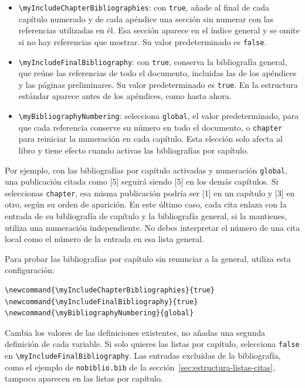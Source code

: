 \begin{itemize}
  \item \texttt{\textbackslash{}myIncludeChapterBibliographies}: con \texttt{true}, añade al final de cada capítulo numerado y de cada apéndice una sección sin numerar con las referencias utilizadas en él. Esa sección aparece en el índice general y se omite si no hay referencias que mostrar. Su valor predeterminado es \texttt{false}.
  \item \texttt{\textbackslash{}myIncludeFinalBibliography}: con \texttt{true}, conserva la bibliografía general, que reúne las referencias de todo el documento, incluidas las de los apéndices y las páginas preliminares. Su valor predeterminado es \texttt{true}. En la estructura estándar aparece antes de los apéndices, como hasta ahora.
  \item \texttt{\textbackslash{}myBibliographyNumbering}: selecciona \texttt{global}, el valor predeterminado, para que cada referencia conserve su número en todo el documento, o \texttt{chapter} para reiniciar la numeración en cada capítulo. Esta elección solo afecta al libro y tiene efecto cuando activas las bibliografías por capítulo.
\end{itemize}

Por ejemplo, con las bibliografías por capítulo activadas y numeración \texttt{global}, una publicación citada como [5] seguirá siendo [5] en los demás capítulos. Si seleccionas \texttt{chapter}, esa misma publicación podría ser [1] en un capítulo y [3] en otro, según su orden de aparición. En este último caso, cada cita enlaza con la entrada de su bibliografía de capítulo y la bibliografía general, si la mantienes, utiliza una numeración independiente. No debes interpretar el número de una cita local como el número de la entrada en esa lista general.

Para probar las bibliografías por capítulo sin renunciar a la general, utiliza esta configuración:

\begin{verbatim}
\newcommand{\myIncludeChapterBibliographies}{true}
\newcommand{\myIncludeFinalBibliography}{true}
\newcommand{\myBibliographyNumbering}{global}
\end{verbatim}

Cambia los valores de las definiciones existentes, no añadas una segunda definición de cada variable. Si solo quieres las listas por capítulo, selecciona \texttt{false} en \texttt{\textbackslash{}myIncludeFinalBibliography}. Las entradas excluidas de la bibliografía, como el ejemplo de \texttt{nobiblio.bib} de la sección~\ref{sec:estructura-listas-citas}, tampoco aparecen en las listas por capítulo.

